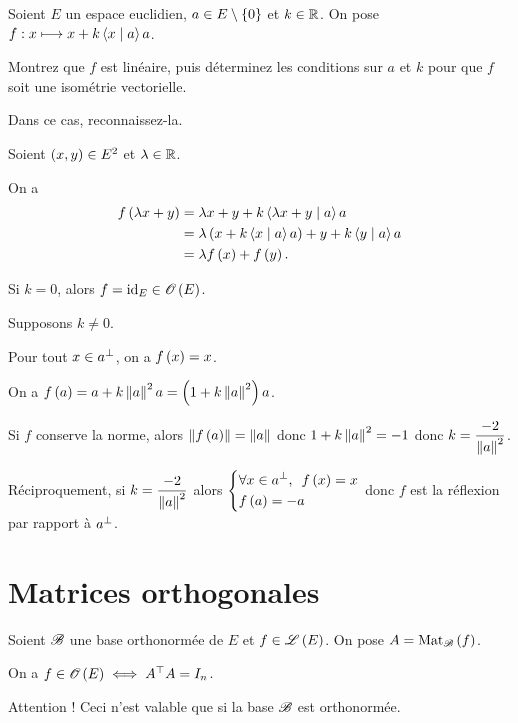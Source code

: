 \begin{exo}
Soient \(E\) un espace euclidien, \(a\in E\setminus\left\lbrace0\right\rbrace\) et \(k\in\mathbb{R}\). On pose \(f:x\mapsto x+k\ps{x}{a}a\).

Montrez que \(f\) est linéaire, puis déterminez les conditions sur \(a\) et \(k\) pour que \(f\) soit une isométrie vectorielle.

Dans ce cas, reconnaissez-la.
\end{exo}

\begin{corr}
Soient \(\left(x,y\right)\in E^2\) et \(\lambda\in\mathbb{R}\).

On a \[\begin{aligned}
f\paren{\lambda x+y}&=\lambda x+y+k\ps{\lambda x+y}{a}a \\
&=\lambda\paren{x+k\ps{x}{a}a}+y+k\ps{y}{a}a \\
&=\lambda f\paren{x}+f\paren{y}.
\end{aligned}\]

Si \(k=0\), alors \(f=\id{E}\in\Orth{}[E]\).

Supposons \(k\not=0\).

Pour tout \(x\in a^{\perp}\), on a \(f\left(x\right)=x\).

On a \(f\paren{a}=a+k\norme{a}^2a=\paren{1+k\norme{a}^2}a\).

Si \(f\) conserve la norme, alors \(\norme{f\paren{a}}=\norme{a}\) donc \(1+k\norme{a}^2=-1\) donc \(k=\dfrac{-2}{\norme{a}^2}\).

Réciproquement, si \(k=\dfrac{-2}{\norme{a}^2}\) alors \(\begin{dcases}
\quantifs{\forall x\in a\ortho}f\paren{x}=x \\
f\paren{a}=-a
\end{dcases}\) donc \(f\) est la réflexion par rapport à \(a^{\perp}\).
\end{corr}

\section{Matrices orthogonales}

\begin{prop}
Soient \(\mathscr{B}\) une base orthonormée de \(E\) et \(f\in\mathscr{L}\left(E\right)\). On pose \(A=\Mat{f}\).

On a \(f\in\Orth{}[E]\ssi\trans{A}A=I_n\).
\end{prop}

Attention ! Ceci n'est valable que si la base \(\mathscr{B}\) est orthonormée.

